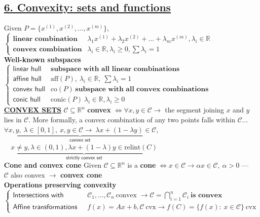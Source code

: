\documentclass[a4paper]{article}
\begin{document}
\subsection*{\underline{6. Convexity: sets and functions}} 
Given $P=\{x^{(1)}, x^{(2)}, ..., x^{(m)}\}$, $\begin{cases}
    \textbf{linear combination} & \lambda_1 x^{(1)}+\lambda_2 x^{(2)}+...+\lambda_m x^{(m)} , \lambda_i \in \mathbb{R}\\
    \textbf{convex combination} & \lambda_i \in \mathbb{R}, \lambda_i \ge 0, \sum \lambda_i = 1
\end{cases}$\\
\textbf{Well-known subspaces} $\begin{cases}
    \textsf{linear hull}&\textbf{subspace with all linear combinations}\\
    \textsf{affine hull}&\text{aff}(P), \ \lambda_i \in \mathbb{R},\ \sum \lambda_i = 1\\
    \textsf{convex hull}&\text{co}(P)\ \textbf{subspace with all convex combinations}\\
    \textsf{conic hull}&\text{conic}(P) \ \lambda_i \in \mathbb{R}, \lambda_i \ge 0
\end{cases}$\\
\textbf{\underline{CONVEX SETS}} $\mathcal{C}\subseteq\mathbb{R}^n$ \textbf{convex} $\iff \forall x,y \in \mathcal{C} \to$ the segment joining $x$ and $y$ lies in $\mathcal{C}$. More formally, a convex combination of any two points falls within $\mathcal{C}$...\\
$\underbrace{\forall x,y, \ \lambda \in [0,1], \ x,y \in \mathcal{C} \to \ \lambda x + (1-\lambda{y})\in\mathcal{C}}_{\textsf{convex set}}$, $\quad\underbrace{x\ne{y}, \lambda \in (0,1), \lambda{x}+(1-\lambda){y} \in \text{relint}(C) }_{\textsf{strictly convex set}}$\\
\textbf{Cone and convex cone} Given $\mathcal{C}\subseteq\mathbb{R}^n$ is a \textbf{cone} $\iff x\in\mathcal{C} \to \alpha{x}\in\mathcal{C}, \ \alpha>0$ --- $\mathcal{C}$ also convex $\to$ \textbf{convex cone}\\
\textbf{Operations preserving convexity}  $\begin{cases}
    \textsf{Intersections with convex sets}& \mathcal{C}_1, ..., \mathcal{C}_n \ \text{convex } \to \mathcal{C}=\bigcap_{i=1}^n{\mathcal{C}_i} \ \textbf{is convex}\\
    \textsf{Affine transformations}&f(x)=Ax+b, \mathcal{C} \ \text{cvx} \to  f(C)=\{f(x): \ x\in\mathcal{C}\}\ \text{cvx}
\end{cases}$\\
\end{document}

